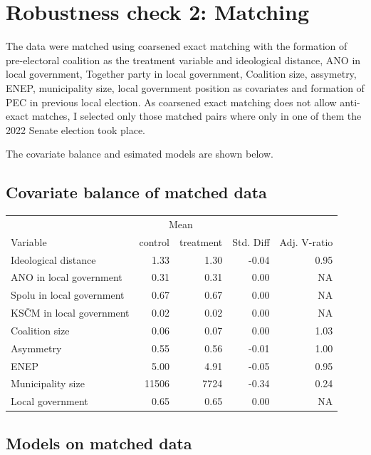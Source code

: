 \documentclass[]{interact}
\theoremstyle{plain}%
\theoremstyle{definition}
\theoremstyle{remark}
\begin{document}
\newpage
\section{Robustness check 2: Matching}
\label{app:2}

The data were matched using coarsened exact matching with the formation of pre-electoral coalition as the treatment variable and ideological distance, ANO in local government, Together party in local government, Coalition size, assymetry, ENEP, municipality size, local government position as covariates and formation of PEC in previous local election. 
As coarsened exact matching does not allow anti-exact matches, I selected only those matched pairs where only in one of them the 2022 Senate election took place.

The covariate balance and esimated models are shown below.

\subsection{Covariate balance of matched data \label{tab:4}}

\begin{tabular}{|l|rr|r|r|}
\hline
  & \multicolumn{2}{c|}{Mean} &  &  \\
Variable  & control & treatment & Std. Diff &	Adj. V-ratio\\
\hline
Ideological distance & 1.33 & 1.30 & -0.04 & 0.95 \\
\hline
ANO in local government & 0.31 & 0.31 & 0.00 & NA\\
\hline
Spolu in local government & 0.67 & 0.67 & 0.00 & NA\\
\hline
KSČM in local government & 0.02 & 0.02 & 0.00 & NA\\
\hline
Coalition size & 0.06 & 0.07 & 0.00 & 1.03 \\
\hline
Asymmetry & 0.55 & 0.56 & -0.01 & 1.00 \\
\hline
ENEP & 5.00 & 4.91 & -0.05 & 0.95 \\
\hline
Municipality size & 11506 & 7724 & -0.34 & 0.24 \\
\hline
Local government & 0.65 & 0.65 & 0.00 & NA\\
\hline
\end{tabular}

\subsection{Models on matched data \label{tab:5}}

\end{document}
